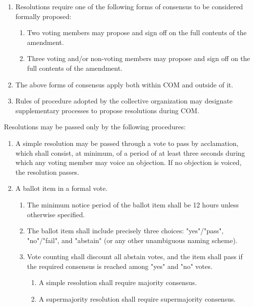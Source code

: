 \documentclass[11pt]{article}
\newcounter{h1}
\newcounter{h2}[h1]
\newcounter{h3}[h2]
\begin{document}


\begin{enumerate}
  \item Resolutions require one of the following forms of consensus to be considered formally proposed:
  \begin{enumerate}
    \item Two voting members may propose and sign off on the full contents of the amendment.
    \item Three voting and/or non-voting members may propose and sign off on the full contents of the amendment.
  \end{enumerate}
  \item The above forms of consensus apply both within COM and outside of it.
  \item Rules of procedure adopted by the collective organization may designate supplementary processes to propose resolutions during COM.
\end{enumerate}


Resolutions may be passed only by the following procedures:

\begin{enumerate}
  \item A simple resolution may be passed through a vote to pass by acclamation, which shall consist, at minimum, of a period of at least three seconds during which any voting member may voice an objection. If no objection is voiced, the resolution passes.
  \item A ballot item in a formal vote.
  \begin{enumerate}
    \item  The minimum notice period of the ballot item shall be 12 hours unless otherwise specified.
    \item The ballot item shall include precisely three choices: "yes"/"pass", "no"/"fail", and "abstain" (or any other unambiguous naming scheme).
    \item Vote counting shall discount all abstain votes, and the item shall pass if the required consensus is reached among "yes" and "no" votes.
    \begin{enumerate}
      \item A simple resolution shall require majority consensus.
      \item A supermajority resolution shall require supermajority consensus.
    \end{enumerate}
  \end{enumerate}
\end{enumerate}
\end{document}
